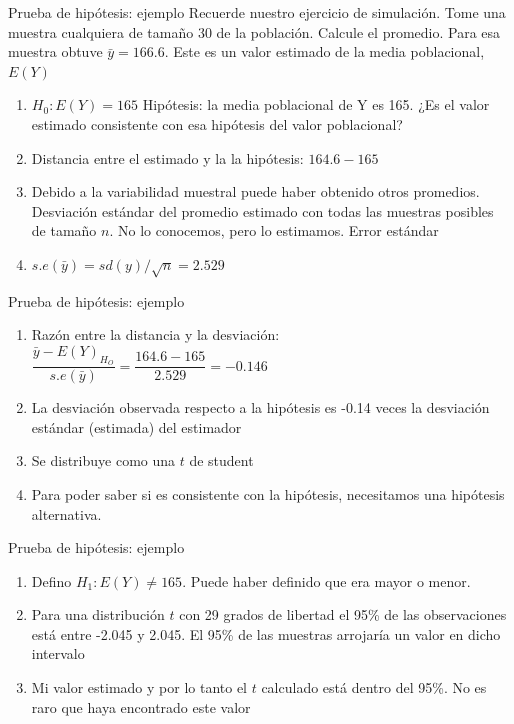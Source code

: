 \documentclass{beamer}
\begin{document}
\begin{frame}{Prueba de hipótesis: ejemplo}
    Recuerde nuestro ejercicio de simulación. Tome una muestra cualquiera de tamaño 30 de la población. Calcule el promedio. Para esa muestra obtuve $\bar{y}=166.6$. Este es un valor estimado de la media poblacional, $E(Y)$
    \begin{enumerate}
        \item $H_0:E(Y)=165$ Hipótesis: la media poblacional de Y es 165. ¿Es el valor estimado consistente con esa hipótesis del valor poblacional?
        \item Distancia entre el estimado y la la hipótesis: $164.6-165$
        \item Debido a la variabilidad muestral puede haber obtenido otros promedios. Desviación estándar del promedio estimado con todas las muestras posibles de tamaño $n$. No lo conocemos, pero lo estimamos. Error estándar
        \item $s.e(\bar{y})=sd(y)/\sqrt{n}=2.529$
    \end{enumerate}
\end{frame}

\begin{frame}{Prueba de hipótesis: ejemplo}
    \begin{enumerate}[start=5]
        \item Razón entre la distancia y la desviación: $\dfrac{\bar{y}-E(Y)_{H_O}}{s.e(\bar{y})}=\dfrac{164.6-165}{2.529}=-0.146$
        \item La desviación observada respecto a la hipótesis es -0.14 veces la desviación estándar (estimada) del estimador
        \item Se distribuye como una $t$ de student
        \item Para poder saber si es consistente con la hipótesis, necesitamos una hipótesis alternativa. 
    \end{enumerate}
\end{frame}

\begin{frame}{Prueba de hipótesis: ejemplo}

\begin{enumerate}[start=9]
    \item Defino $H_1:E(Y)\neq 165$. Puede haber definido que era mayor o menor. 
    \item Para una distribución $t$ con 29 grados de libertad el 95\% de las observaciones está entre -2.045 y 2.045. El 95\% de las muestras arrojaría un valor en dicho intervalo
    \item Mi valor estimado y por lo tanto el $t$ calculado está dentro del 95\%. No es raro que haya encontrado este valor
\end{enumerate}
    
\end{frame}
\end{document}
